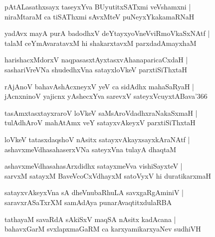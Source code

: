 \documentclass[twoside,12pt,openright]{book}
\newcounter{shloka}[chapter]
\begin{document}
\begin{shloka}%
pAtALasathxsayx taseyxYva BUyutitxSATxmi veVshamxni |\\
niraMtaraM ca tiSAThxmi sAvxMteV puNeyxYkakamaRNaH 
\end{shloka}

\begin{shloka}%
yadAvx mayA purA badodhxV deYtayxyoVneVviRmoVkaSxNAtf |\\
talaM ceYmAvaratavxM hi shakarxtavxM parxdadAmayxhaM 
\end{shloka}

\begin{shloka}%
harishacxMdorxV naqpasasxtAyxtasxvAhanaparicaCxdaH |\\
sashariVreVNa shudedhxVna satayxloVkeV parxtiSiThxtaH 
\end{shloka}

\begin{shloka}%
rAjAnoV bahavAshAcxneyxV yeV ca sidAdhx mahaSaRyaH |\\
jAcnxninoV yajicnx yAshecxYva sarevxV sateyxVcuyxtABava\char'366
\end{shloka}

\begin{shloka}%
tasAmxtasxtayxraroV loVkeV saMsAroVdadhxraNakaSxmaH |\\
tulAdhAroV mahAtAmx veY satayxvAkeyxV parxtiSiThxtaH 
\end{shloka}

\begin{shloka}%
loVkeV tatasxdaqshoV nAsitx satayxvAkayxsayxkAraNAtf |\\
ashavxmeVdhasahaserxVNa sateyxVna tulayA dhaqtaM 
\end{shloka}

\begin{shloka}%
ashavxmeVdhasahasArxdidhx satayxmeVva vishiSayxteV |\\
sarvxM satayxM BaveVcoCxVdhayxM satoVyxV hi duratikarxmaH 
\end{shloka}

\begin{shloka}%
satayxvAkeyxVna sA dheVnubaRhuLA savxgaRgAminiV |\\
saravxrASaTxrXM samAdAya punarAvaqtitxdulaRBA
\end{shloka}

\begin{shloka}%
tathayaM savaRdA sAkiSxV maqSA nAsitx kadAcana |\\
bahavxGarM svxlapxmaGaRM ca karxyamikarxyaNev sudhiVH 
\end{shloka}
\end{document}
